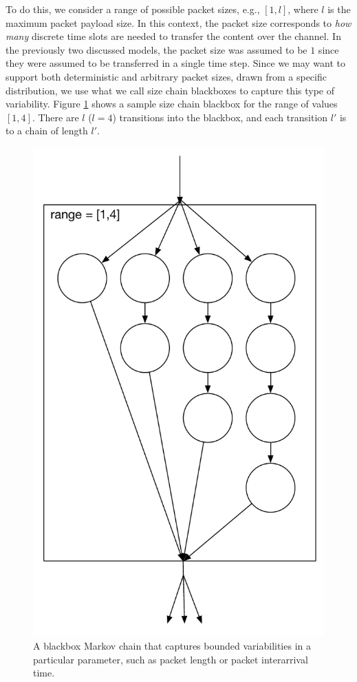 \documentclass{llncs}
\begin{document}
To do this, we consider a range of possible packet sizes, e.g., $[1,l]$, where $l$ is the maximum packet payload size. In this context, the packet size corresponds to \emph{how many} discrete time slots are needed to transfer the content over the channel. In the previously two discussed models, the packet size was assumed to be $1$ since they were assumed to be transferred in a single time step. Since we may want to support both deterministic and arbitrary packet sizes, drawn from a specific distribution, we use what we call size chain blackboxes to capture this type of variability. Figure \ref{fig:size_chain} shows a sample size chain blackbox for the range of values $[1,4]$. There are $l$ ($l = 4$) transitions into the blackbox, and each transition $l'$ is to a chain of length $l'$. 

\begin{figure}
\begin{center}
\includegraphics[scale=0.35]{../../sketches/size_chain_old.pdf}
\caption{A blackbox Markov chain that captures bounded variabilities in a particular parameter, such as packet length or packet interarrival time.}
\label{fig:size_chain}
\end{center}
\end{figure}
\end{document}
